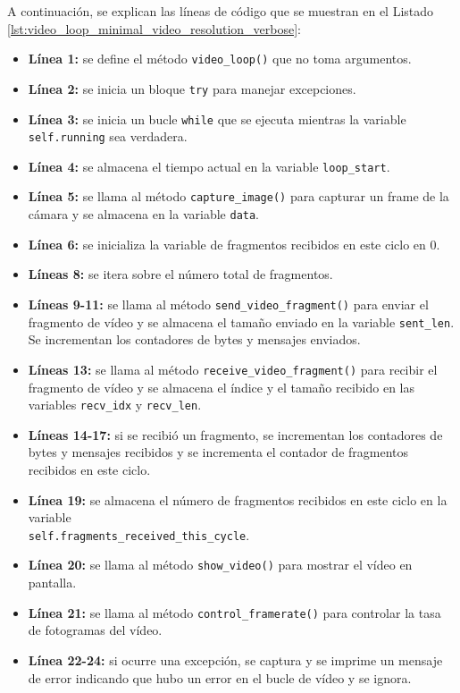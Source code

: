 A continuación, se explican las líneas de código que se muestran en el Listado \ref{lst:video_loop_minimal_video_resolution_verbose}:
\begin{itemize}
    \item \textbf{Línea 1:} se define el método \texttt{video\_loop()} que no toma argumentos.
    \item \textbf{Línea 2:} se inicia un bloque \texttt{try} para manejar excepciones.
    \item \textbf{Línea 3:} se inicia un bucle \texttt{while} que se ejecuta mientras la variable \texttt{self.running} sea verdadera.
    \item \textbf{Línea 4:} se almacena el tiempo actual en la variable \texttt{loop\_start}.
    \item \textbf{Línea 5:} se llama al método \texttt{capture\_image()} para capturar un frame de la cámara y se almacena en la variable \texttt{data}.
    \item \textbf{Línea 6:} se inicializa la variable de fragmentos recibidos en este ciclo en 0.
    \item \textbf{Líneas 8:} se itera sobre el número total de fragmentos.
    \item \textbf{Líneas 9-11:} se llama al método \texttt{send\_video\_fragment()} para enviar el fragmento de vídeo y se almacena el tamaño enviado en la variable \texttt{sent\_len}. Se incrementan los contadores de bytes y mensajes enviados.
    \item \textbf{Líneas 13:} se llama al método \texttt{receive\_video\_fragment()} para recibir el fragmento de vídeo y se almacena el índice y el tamaño recibido en las variables \texttt{recv\_idx} y \texttt{recv\_len}.
    \item \textbf{Líneas 14-17:} si se recibió un fragmento, se incrementan los contadores de bytes y mensajes recibidos y se incrementa el contador de fragmentos recibidos en este ciclo.
    \item \textbf{Línea 19:} se almacena el número de fragmentos recibidos en este ciclo en la variable\\
    \texttt{self.fragments\_received\_this\_cycle}.
    \item \textbf{Línea 20:} se llama al método \texttt{show\_video()} para mostrar el vídeo en pantalla.
    \item \textbf{Línea 21:} se llama al método \texttt{control\_framerate()} para controlar la tasa de fotogramas del vídeo.
    \item \textbf{Línea 22-24:} si ocurre una excepción, se captura y se imprime un mensaje de error indicando que hubo un error en el bucle de vídeo y se ignora.
\end{itemize}
\vspace{\baselineskip}

